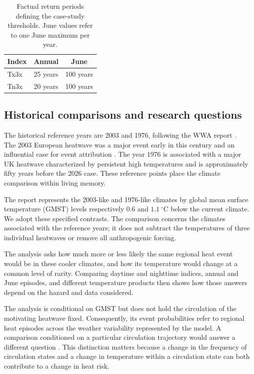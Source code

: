 \documentclass[11pt]{article}
\begin{document}
\begin{table}[htbp]
\centering
\caption{Factual return periods defining the case-study thresholds.
June values refer to one June maximum per year.}
\label{tab:events}
\begin{tabular}{lcc}\toprule
Index & Annual & June\\\midrule
Tx3x & 25 years & 100 years\\
Tn3x & 20 years & 100 years\\\bottomrule
\end{tabular}
\end{table}

\subsection{Historical comparisons and research questions}
The historical reference years are 2003 and 1976, following the WWA
report \cite{WWA2026EuropeanHeatwave}. The 2003 European heatwave was
a
major event early in this century and an influential case for event
attribution \cite{stott2004human}. The year 1976 is associated with a
major UK heatwave characterized by persistent high temperatures and is
approximately fifty years before the 2026 case. These reference points
place the climate comparison within living memory.

The report represents the 2003-like and 1976-like climates by global
mean surface temperature (GMST) levels respectively $0.6$ and
$1.1\ ^{\circ}\mathrm{C}$ below the current climate. We adopt these
specified contrasts. The comparison concerns the climates associated
with the reference years; it does not subtract the temperatures of
three individual heatwaves or remove all anthropogenic forcing.

The analysis asks how much more or less likely the same regional heat
event would be in these cooler climates, and how its temperature would
change at a common level of rarity. Comparing daytime and nighttime
indices, annual and June episodes, and different temperature products
then shows how those answers depend on the hazard and data considered.

The analysis is conditional on GMST but does not hold the circulation
of the motivating heatwave fixed. Consequently, its event probabilities
refer to regional heat episodes across the weather variability
represented by the model. A comparison conditioned on a particular
circulation trajectory would answer a different question
\cite{shepherd2016common}. This distinction matters because a change
in the
frequency of circulation states and a change in temperature within a
circulation state can both contribute to a change in heat risk.
\end{document}
